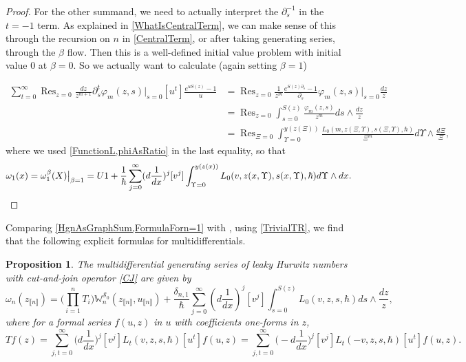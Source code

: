 \documentclass[10pt,a4paper,oneside,no-math,reqno]{amsart}%
\theoremstyle{plain}
\newtheorem{proposition}[theorem]{Proposition}
\theoremstyle{definition}
\theoremstyle{remark}
\numberwithin{equation}{section}
\renewcommand{\phi}{\varphi}
\newcommand{\mb}[1]{\mathbb{#1}}
\newcommand{\mc}[1]{\mathcal{#1}}
\newcommand{\1}{\mathds{1}}
\newcommand{\<}{\langle}
\renewcommand{\>}{\rangle}
\newcommand{\del}{\partial}
\DeclareMathOperator*{\Res}{Res}
\begin{document}
\begin{proof}
	For the other summand, we need to actually interpret the $ \del_s^{-1}$ in the $ t = -1$ term. As explained in \cref{WhatIsCentralTerm}, we can make sense of this through the recursion on $n $ in \cref{CentralTerm}, or after taking generating series, through the $\beta $ flow. Then this is a well-defined initial value problem with initial value $0$ at $ \beta = 0$. So we actually want to calculate (again setting $ \beta = 1$)

	\begin{equation}
		\begin{split}
			\sum_{t=0}^\infty \Res_{z=0} \frac{dz}{z^{m+1}} \del_s^t \phi_m(z,s )\Big|_{s = 0} [u^t ] \frac{e^{u S(z)} - 1}{u}
			&=
			\Res_{z=0} \frac{1}{z^m} \frac{e^{S(z) \del_s} - 1}{\del_s} \phi_m (z,s) \Big|_{s=0} \frac{dz}{z}
			\\
			&=
			\Res_{z=0} \int_{s=0}^{S(z)} \frac{\phi_m ( z,s )}{z^m} ds \wedge \frac{dz}{z}
			\\
			&=
			\Res_{\Xi = 0} \int_{\Upsilon=0}^{y(z(\Xi))} \frac{L_0(m,z(\Xi,\Upsilon), s(\Xi,\Upsilon),\hbar)}{\Xi^m} d\Upsilon \wedge \frac{d\Xi}{\Xi},
		\end{split}
	\end{equation}
	where we used \cref{FunctionL,phiAsRatio} in the last equality, so that
	\begin{equation*}
			\omega_1 (x)
            =
            \omega_1^\beta (X) \big|_{\beta = 1}
			=
			U 1 + \frac{1}{\hbar}\sum_{j=0}^\infty (d \frac{1}{dx})^j [v^j] \int_{\Upsilon=0}^{y(z(x))} L_0(v, z(x,\Upsilon), s(x,\Upsilon),\hbar) d\Upsilon \wedge dx .
			\qedhere
	\end{equation*}
\end{proof}

Comparing \cref{HgnAsGraphSum,FormulaForn=1} with \cite[Proof of proposition 4.4]{ABDKS24}, using \cref{TrivialTR}, we find that the following explicit formulas for multidifferentials.

\begin{proposition}\label{LeakyMultidifferentials}
	The multidifferential generating series of leaky Hurwitz numbers with cut-and-join operator \eqref{CJ} are given by
	\begin{equation}
		\omega_n (z_{\llbracket n\rrbracket})
		=
		\Big( \prod_{i=1}^n T_i \Big)
		\mb{W}_n^{\mc{S}_0} (z_{\llbracket n\rrbracket}, u_{\llbracket n\rrbracket}) 
		+
		\frac{\delta_{n,1}}{\hbar} \sum_{j=0}^\infty ( d \frac{1}{dx} )^j [v^j] \int_{s = 0}^{S(z)} L_0 (v, z, s, \hbar) ds \wedge \frac{dz}{z},
	\end{equation}
	where for a formal series $ f(u,z) $ in $u$ with coefficients one-forms in $ z$,
	\begin{equation}
		Tf (z)
		=
		\sum_{j,t = 0}^\infty \big(d \frac{1}{dx}\big)^j  [v^j] L_t(v, z, s, \hbar) [u^t] f(u,z)
		=
		\sum_{j,t = 0}^\infty \big(- d \frac{1}{dx}\big)^j  [v^j] L_t(-v, z, s, \hbar) [u^t] f(u,z) .
	\end{equation}
\end{proposition}
\end{document}
